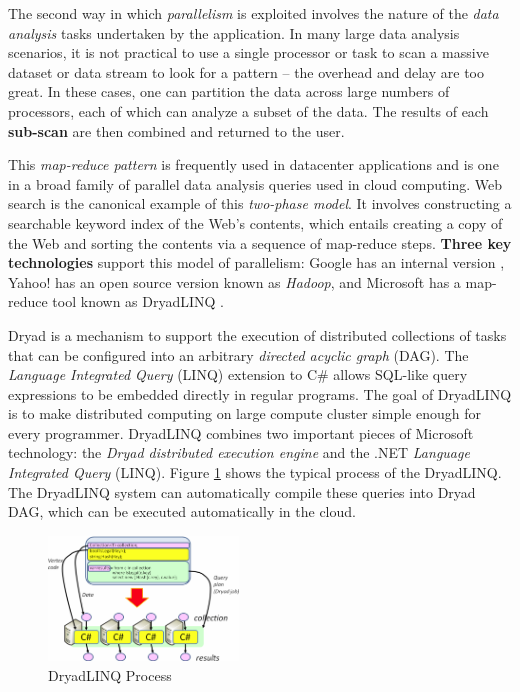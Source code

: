 \documentclass[twocolumn]{article}
\begin{document}
The second way in which \emph{parallelism} is exploited involves the nature of the \emph{data analysis} tasks undertaken by the application. In many large data analysis scenarios, it is not practical to use a single processor or task to scan a massive dataset or data stream to look for a pattern -- the overhead and delay are too great. In these cases, one can partition the data across large numbers of processors, each of which can analyze a subset of the data. The results of each {\bfseries sub-scan} are then combined and returned to the user.

This \emph{map-reduce pattern} is frequently used in datacenter applications and is one in a broad family of parallel data analysis queries used in cloud computing. 
Web search is the canonical example of this \emph{two-phase model}. It involves constructing a searchable keyword index of the Web's contents, which entails creating a copy of the Web and sorting the contents via a sequence of map-reduce steps. 
{\bfseries Three key technologies} support this model of parallelism: Google has an internal version \cite{Dean:2004}, Yahoo! has an open source version known as \emph{Hadoop}, and Microsoft has a map- reduce tool known as DryadLINQ \cite{Isard:2008}. 

Dryad is a mechanism to support the execution of distributed collections of tasks that can be configured into an arbitrary \emph{directed acyclic graph} (DAG). 
The \emph{Language Integrated Query} (LINQ) extension to C$\#$ allows SQL-like query expressions to be embedded directly in regular programs. 
The goal of DryadLINQ is to make distributed computing on large compute cluster simple enough for every programmer. DryadLINQ combines two important pieces of Microsoft technology: the \emph{Dryad distributed execution engine} and the .NET \emph{Language Integrated Query} (LINQ).
Figure \ref{dryad} shows the typical process of the DryadLINQ.
The DryadLINQ system can automatically compile these queries into Dryad DAG, which can be executed automatically in the cloud.
\begin{figure}[htb]
	\centering
	\includegraphics[width=0.45\textwidth]{dryad}
	\caption{DryadLINQ Process}
	\label{dryad}
\end{figure}
\end{document}

